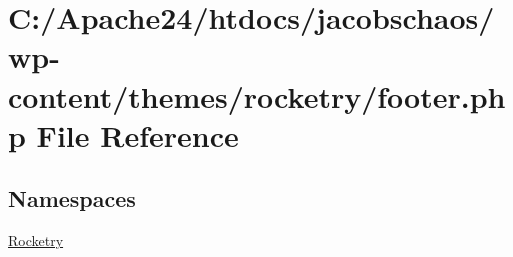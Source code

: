 \hypertarget{footer_8php}{}\section{C\+:/\+Apache24/htdocs/jacobschaos/wp-\/content/themes/rocketry/footer.php File Reference}
\label{footer_8php}
\subsection*{Namespaces}
\begin{DoxyCompactItemize}
\item 
 \hyperlink{namespace_rocketry}{Rocketry}
\end{DoxyCompactItemize}
